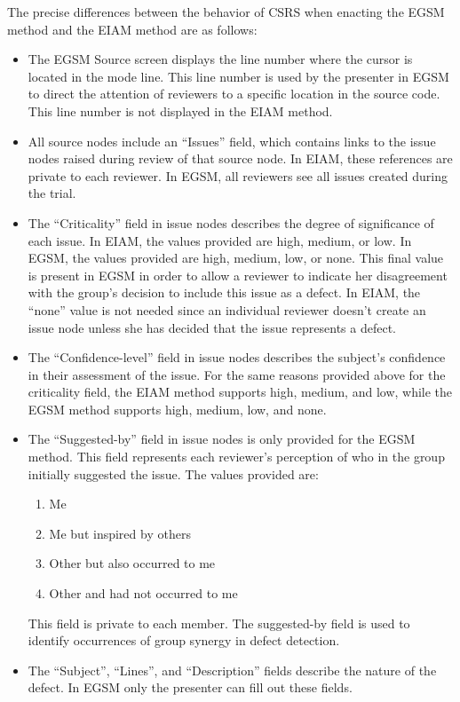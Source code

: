 The precise differences between the behavior of CSRS when enacting the 
EGSM method and the EIAM method are as follows:

\begin{itemize}
\item The EGSM Source screen displays the line number where the cursor is
  located in the mode line. This line number is used by the presenter in
  EGSM to direct the attention of reviewers to a specific location in the
  source code. This line number is not displayed in the EIAM method.

\item All source nodes include an ``Issues'' field, which contains links to
  the issue nodes raised during review of that source node. In EIAM,
  these references are private to each reviewer. In EGSM, all reviewers see
  all issues created during the trial.
  
\item The ``Criticality'' field in issue nodes describes the degree of
  significance of each issue. In EIAM, the values provided
  are  high, medium, or low. In EGSM, the values provided are high, medium,
  low, or none. This final value is present in EGSM in order to allow a 
  reviewer to indicate her disagreement with the group's decision to
  include this issue as a defect. In EIAM, the ``none'' value is not needed
  since an individual reviewer doesn't create an issue node unless she has
  decided that the issue represents a defect.
  
\item The ``Confidence-level'' field in issue nodes describes the subject's
  confidence in their assessment of the issue. For the same reasons
  provided above for the criticality field, the EIAM method supports high,
  medium, and low, while the EGSM method supports high, medium, low, and
  none.

  
\item The ``Suggested-by'' field in issue nodes is only provided for the
  EGSM method.
  This field represents each reviewer's perception of who 
  in the group initially suggested the issue. The values provided are:
  \begin{enumerate}
  \item Me
  \item Me but inspired by others
  \item Other but also occurred to  me
  \item Other and had not occurred to me
  \end{enumerate}
  
  This field is private to each member.  The suggested-by field is used to
  identify occurrences of group synergy in defect detection. 
  
\item The ``Subject'', ``Lines'', and ``Description'' fields describe the
  nature of the defect. In EGSM only the presenter can fill out these
  fields.

\end{itemize}




